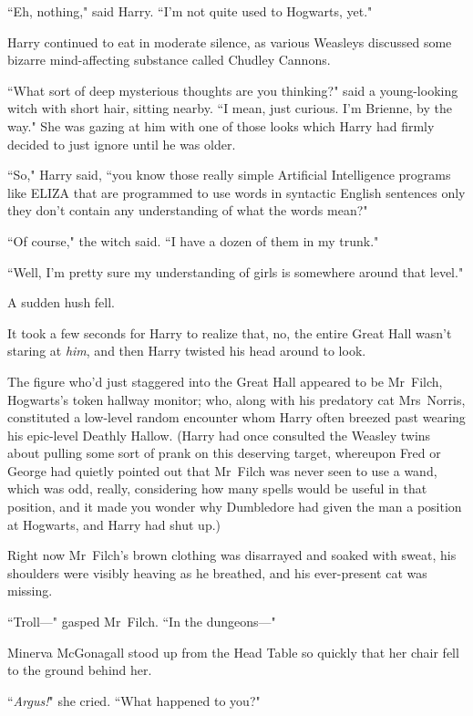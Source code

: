 ``Eh, nothing," said Harry. ``I'm not quite used to Hogwarts, yet."

Harry continued to eat in moderate silence, as various Weasleys discussed some bizarre mind-affecting substance called Chudley Cannons.

``What sort of deep mysterious thoughts are you thinking?" said a young-looking witch with short hair, sitting nearby. ``I mean, just curious. I'm Brienne, by the way." She was gazing at him with one of those looks which Harry had firmly decided to just ignore until he was older.

``So," Harry said, ``you know those really simple Artificial Intelligence programs like ELIZA that are programmed to use words in syntactic English sentences only they don't contain any understanding of what the words mean?"

``Of course," the witch said. ``I have a dozen of them in my trunk."

``Well, I'm pretty sure my understanding of girls is somewhere around that level."

A sudden hush fell.

It took a few seconds for Harry to realize that, no, the entire Great Hall wasn't staring at \emph{him}, and then Harry twisted his head around to look.

The figure who'd just staggered into the Great Hall appeared to be Mr~Filch, Hogwarts's token hallway monitor; who, along with his predatory cat Mrs~Norris, constituted a low-level random encounter whom Harry often breezed past wearing his epic-level Deathly Hallow. (Harry had once consulted the Weasley twins about pulling some sort of prank on this deserving target, whereupon Fred or George had quietly pointed out that Mr~Filch was never seen to use a wand, which was odd, really, considering how many spells would be useful in that position, and it made you wonder why Dumbledore had given the man a position at Hogwarts, and Harry had shut up.)

Right now Mr~Filch's brown clothing was disarrayed and soaked with sweat, his shoulders were visibly heaving as he breathed, and his ever-present cat was missing.

``Troll—" gasped Mr~Filch. ``In the dungeons—"

\later

Minerva McGonagall stood up from the Head Table so quickly that her chair fell to the ground behind her.

``\emph{Argus!}" she cried. ``What happened to you?"

